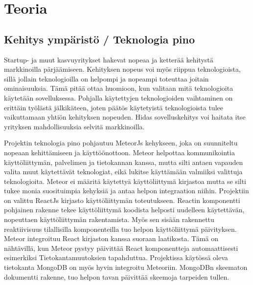 \documentclass[11pt,a4paper,titlepage,oneside]{article}
\begin{document}
\newpage
\section{Teoria}                %



\subsection{Kehitys ympäristö / Teknologia pino}




Startup- ja muut kasvuyritykset hakevat nopeaa ja ketterää kehitystä markkinoilla pärjäämiseen.
Kehityksen nopeus voi myös riippua teknologioista, sillä jollain teknologioilla on helpompi ja nopeampi toteuttaa joitain ominaisuuksia.
Tämä pitää ottaa huomioon, kun valitaan mitä teknologioita käytetään sovelluksessa.
Pohjalla käytettyjen teknologioiden vaihtaminen on erittäin työlästä jälkikäteen,
joten päätös käytetyistä teknologioista tulee vaikuttamaan yhtiön kehityksen nopeuden.
Hidas sovelluskehitys voi haitata itse yrityksen mahdollisuuksia selvitä markkinoilla.
\medskip



Projektin teknologia pino pohjautuu MeteorJs kehykseen, joka on suunniteltu nopeaan kehittämiseen ja käyttöönottoon.
Meteor helpottaa kommunikointia käyttöliittymän, palvelimen ja tietokannan kanssa, 
mutta silti antaen vapauden valita muut käytettävät teknologiat, eikä lukitse käyttämään valmiiksi valittuja teknologioita.
Meteor ei määritä käytettyä käyttöliittymä kirjastoa mutta se silti tukee monia suosituimpia kehyksiä ja antaa helpon integraation niihin.
Projektiin on valittu ReactJs kirjasto käyttöliittymän toteutukseen.
Reactin komponentti pohjainen rakenne tekee käyttöliittymä koodista helposti uudelleen käytettävän, nopeuttaen käyttöliittymän rakentamista. 
Myös sen sisään rakennettu reaktiivisuus tilallisilla komponenteilla tuo helpon käyttöliittymä päivityksen.
Meteor integroituu React kirjaston kanssa suoraan laatikosta.
Tämä on nähtävillä, kun Meteor pystyy päivittää React komponentteja automaattisesti esimerkiksi Tietokantamuutoksien tapahduttua. 
Projektissa käytössä oleva tietokanta MongoDB on myös hyvin integroitu Meteoriin.
MongoDBn skeematon dokumentti rakenne, tuo helpon tavan päivittää skeemoja tarpeiden tullen.
\medskip
\end{document}
